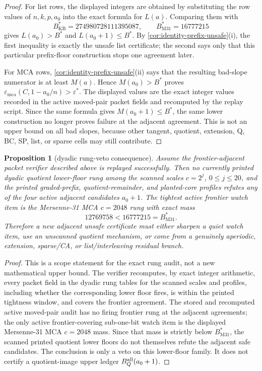 \documentclass[a4paper,11pt]{amsart}
\newtheorem{proposition}[theorem]{Proposition}
\theoremstyle{remark}
\newcommand{\emca}{\varepsilon_{\mathrm{mca}}}
\begin{document}
\begin{proof}
For list rows, the displayed integers are obtained by substituting the row values of \(n,k,p,a_0\) into the exact formula for \(L(a)\).  Comparing them with
\[
        B^*_{\mathrm{KB}}=274980728111395087,
        \qquad
        B^*_{\mathrm{M31}}=16777215
\]
gives \(L(a_0)>B^*\) and \(L(a_0+1)\le B^*\).  By \cref{cor:identity-prefix-unsafe}(i), the first inequality is exactly the unsafe list certificate; the second says only that this particular prefix-floor construction stops one agreement later.

For MCA rows, \cref{cor:identity-prefix-unsafe}(ii) says that the resulting bad-slope numerator is at least \(M(a)\).  Hence \(M(a_0)>B^*\) proves \(\emca(C,1-a_0/n)>\varepsilon^*\).  The displayed values are the exact integer values recorded in the active moved-pair packet fields and recomputed by the replay script.  Since the same formula gives \(M(a_0+1)\le B^*\), the same lower construction no longer proves failure at the adjacent agreement.  This is not an upper bound on all bad slopes, because other tangent, quotient, extension, Q, BC, SP, list, or sparse cells may still contribute.
\end{proof}

\begin{proposition}[dyadic rung-veto consequence]\label{prop:rung-veto}
Assume the frontier-adjacent packet verifier described above is replayed successfully.  Then no currently printed dyadic quotient lower-floor rung among the scanned scales \(c=2^j\), \(0\le j\le20\), and the printed graded-prefix, quotient-remainder, and planted-core profiles refutes any of the four active adjacent candidates \(a_0+1\).  The tightest active frontier watch item is the Mersenne-31 MCA \(c=2048\) rung with exact mass
\[
        12769758<16777215=B^*_{\mathrm{M31}}.
\]
Therefore a new adjacent unsafe certificate must either sharpen a quiet watch item, use an unscanned quotient mechanism, or come from a genuinely aperiodic, extension, sparse/CA, or list/interleaving residual branch.
\end{proposition}

\begin{proof}
This is a scope statement for the exact rung audit, not a new mathematical upper bound.  The verifier recomputes, by exact integer arithmetic, every packet field in the dyadic rung tables for the scanned scales and profiles, including whether the corresponding lower floor fires, is within the printed tightness window, and covers the frontier agreement.  The stored and recomputed active moved-pair audit has no firing frontier rung at the adjacent agreements; the only active frontier-covering sub-one-bit watch item is the displayed Mersenne-31 MCA \(c=2048\) mass.  Since that mass is strictly below \(B^*_{\mathrm{M31}}\), the scanned printed quotient lower floors do not themselves refute the adjacent safe candidates.  The conclusion is only a veto on this lower-floor family.  It does not certify a quotient-image upper ledger \(B_Q^{\rm all}(a_0+1)\).
\end{proof}
\end{document}
